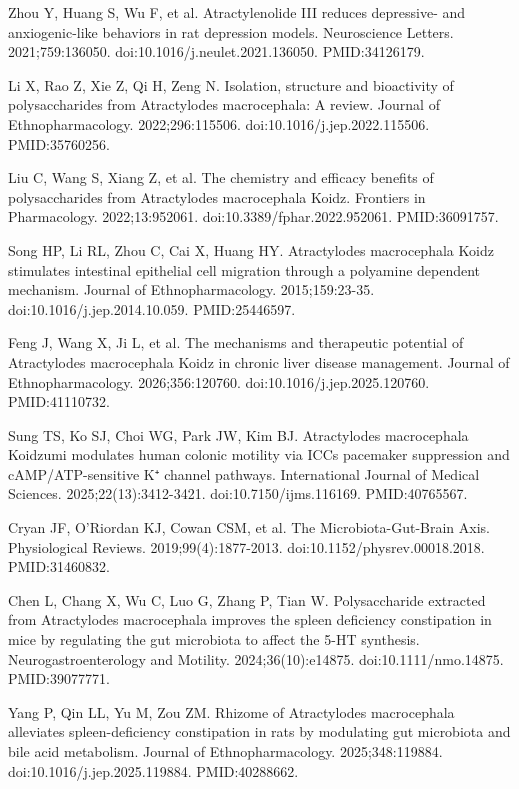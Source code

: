 \documentclass[12pt,oneside]{book}
\newcommand{\reff}[2]{\par\hangindent=7mm\hangafter=1\noindent[#1]\hspace{2mm}#2\par}
\begin{document}
\reff{12}{Zhou Y, Huang S, Wu F, et al. Atractylenolide III reduces depressive- and anxiogenic-like behaviors in rat depression models. Neuroscience Letters. 2021;759:136050. doi:10.1016/j.neulet.2021.136050. PMID:34126179.}

\reff{13}{Li X, Rao Z, Xie Z, Qi H, Zeng N. Isolation, structure and bioactivity of polysaccharides from Atractylodes macrocephala: A review. Journal of Ethnopharmacology. 2022;296:115506. doi:10.1016/j.jep.2022.115506. PMID:35760256.}

\reff{14}{Liu C, Wang S, Xiang Z, et al. The chemistry and efficacy benefits of polysaccharides from Atractylodes macrocephala Koidz. Frontiers in Pharmacology. 2022;13:952061. doi:10.3389/fphar.2022.952061. PMID:36091757.}

\reff{15}{Song HP, Li RL, Zhou C, Cai X, Huang HY. Atractylodes macrocephala Koidz stimulates intestinal epithelial cell migration through a polyamine dependent mechanism. Journal of Ethnopharmacology. 2015;159:23-35. doi:10.1016/j.jep.2014.10.059. PMID:25446597.}

\reff{16}{Feng J, Wang X, Ji L, et al. The mechanisms and therapeutic potential of Atractylodes macrocephala Koidz in chronic liver disease management. Journal of Ethnopharmacology. 2026;356:120760. doi:10.1016/j.jep.2025.120760. PMID:41110732.}

\reff{17}{Sung TS, Ko SJ, Choi WG, Park JW, Kim BJ. Atractylodes macrocephala Koidzumi modulates human colonic motility via ICCs pacemaker suppression and cAMP/ATP-sensitive K⁺ channel pathways. International Journal of Medical Sciences. 2025;22(13):3412-3421. doi:10.7150/ijms.116169. PMID:40765567.}

\reff{18}{Cryan JF, O'Riordan KJ, Cowan CSM, et al. The Microbiota-Gut-Brain Axis. Physiological Reviews. 2019;99(4):1877-2013. doi:10.1152/physrev.00018.2018. PMID:31460832.}

\reff{19}{Chen L, Chang X, Wu C, Luo G, Zhang P, Tian W. Polysaccharide extracted from Atractylodes macrocephala improves the spleen deficiency constipation in mice by regulating the gut microbiota to affect the 5-HT synthesis. Neurogastroenterology and Motility. 2024;36(10):e14875. doi:10.1111/nmo.14875. PMID:39077771.}

\reff{20}{Yang P, Qin LL, Yu M, Zou ZM. Rhizome of Atractylodes macrocephala alleviates spleen-deficiency constipation in rats by modulating gut microbiota and bile acid metabolism. Journal of Ethnopharmacology. 2025;348:119884. doi:10.1016/j.jep.2025.119884. PMID:40288662.}
\end{document}
